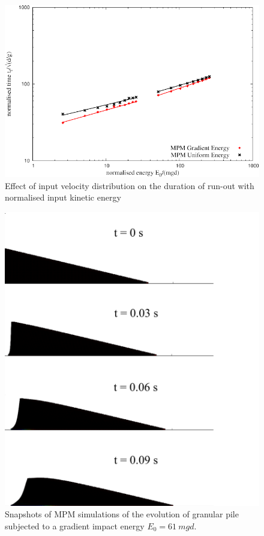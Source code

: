 \begin{figure}[tbph]
\centering
\includegraphics[width=\textwidth]{time_Eo_GU}
\caption{Effect of input velocity distribution on the duration of run-out with 
normalised input kinetic energy}
\label{fig:time_Eo_GU}
\end{figure}

\begin{figure}[tbph]
\centering
\includegraphics[width=\textwidth]{Uniform_Slope_Profile_200J}
\caption{Snapshots of MPM simulations of the evolution of granular pile 
subjected to a gradient impact energy $E_0 = 61 \ mgd$.}
\label{fig:Uniform_Slope_Profile_200J}
\end{figure}

